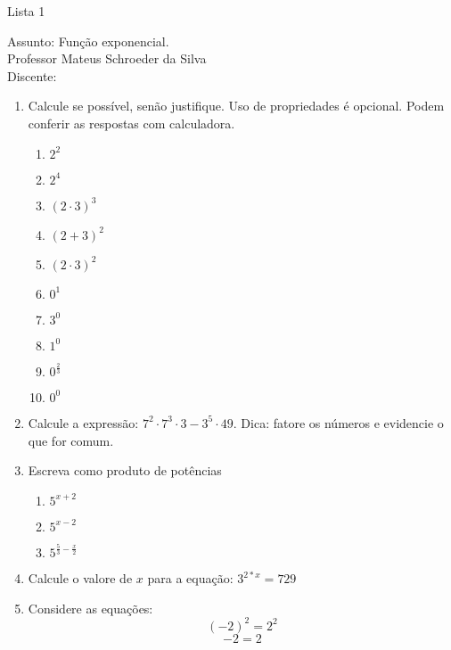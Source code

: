 \documentclass{article}
\begin{document}
\begin{center}
    Lista 1
\end{center}
Assunto: Função exponencial.\\
Professor Mateus Schroeder da Silva\\
Discente: \\

\begin{enumerate}
    \item
        Calcule se possível, senão justifique. Uso de propriedades é opcional. Podem conferir as respostas com calculadora. \\
        \begin{enumerate}[label=\alph*)]
            \item $2^2$
            \item $2^4$
            \item $(2 \cdot 3)^3$
            \item $(2+3)^2$
            \item $(2 \cdot 3)^2$
            \item $0^1$
            \item $3^0$
            \item $1^0$
            \item $0^{\frac{2}{3}}$
            \item $0^0$
          \end{enumerate}
    \item Calcule a expressão: $7^2 \cdot 7^3 \cdot 3 - 3^5 \cdot 49$. Dica: fatore os números e evidencie o que for comum.
    \item Escreva como produto de potências
        \begin{enumerate}[label=\alph*)]
            \item $5^{x+2}$ 
            \item $5^{x-2}$
            \item $5^{\frac{5}{3} - \frac{x}{2}}$
        \end{enumerate}
    \item Calcule o valore de $x$ para a equação:
        $3^{2*x} = 729$
    \item Considere as equações:
        \begin{equation}
            (-2)^2 = 2^2
        \end{equation}
        \begin{equation}
            -2 = 2
        \end{equation}
        \begin{enumerate}[label=\alph*)]

\end{enumerate}
\end{enumerate}
\end{document}
